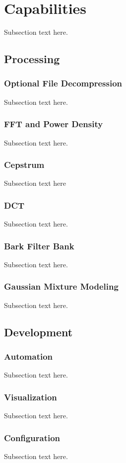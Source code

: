 \documentclass[journal]{IEEEtran}
\begin{document}
\section{Capabilities}
Subsection text here.

\subsection{Processing}
\subsubsection{Optional File Decompression}
Subsection text here.
\subsubsection{FFT and Power Density}
Subsection text here.
\subsubsection{Cepstrum}
Subsection text here
\subsubsection{DCT}
Subsection text here.
\subsubsection{Bark Filter Bank}
Subsection text here.
\subsubsection{Gaussian Mixture Modeling}
Subsection text here.

\subsection{Development}
\subsubsection{Automation}
Subsection text here.
\subsubsection{Visualization}
Subsection text here.
\subsubsection{Configuration}
Subsection text here.
\end{document}
